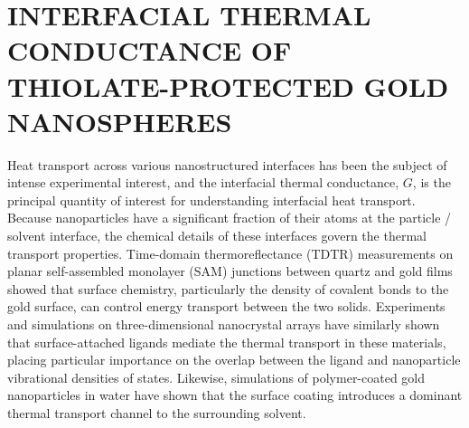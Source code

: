 
\chapter{INTERFACIAL THERMAL CONDUCTANCE OF THIOLATE-PROTECTED GOLD NANOSPHERES}\label{chap:npthiols}


Heat transport across various nanostructured interfaces has been the
subject of intense experimental
interest,\cite{Wilson:2002uq,Ge:2004yg,Shenogina:2009ix,Wang10082007,Schmidt:2008ad,Juve:2009pt,Alper:2010pd,Harikrishna:2013ys}
and the interfacial thermal conductance, $G$, is the principal
quantity of interest for understanding interfacial heat
transport.\cite{Cahill:2003fk} 
Because nanoparticles have a
significant fraction of their atoms at the particle / solvent
interface, the chemical details of these interfaces govern the thermal
transport properties.  Time-domain thermoreflectance (TDTR)
measurements on planar self-assembled monolayer (SAM) junctions
between quartz and gold films showed that surface chemistry,
particularly the density of covalent bonds to the gold surface, can
control energy transport between the two solids.\cite{Losego:2012fr}
Experiments and simulations on three-dimensional nanocrystal arrays
have similarly shown that surface-attached ligands mediate the thermal
transport in these materials, placing particular importance on the
overlap between the ligand and nanoparticle vibrational densities of
states.\cite{Ong:2013rt,Ong:2014yq} Likewise, simulations of
polymer-coated gold nanoparticles in water have shown that the surface
coating introduces a dominant thermal transport channel to the
surrounding solvent.\cite{Soussi:2015fj}

